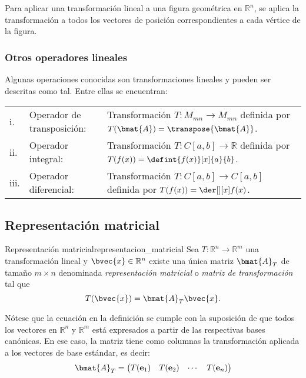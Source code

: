 \documentclass{fmbnotes}
\begin{document}
\begin{tip}
	Para aplicar una transformación lineal a una figura geométrica en \(\mathbb{R}^{n}\), se aplica la transformación a todos los vectores de posición correspondientes a cada vértice de la figura.
\end{tip}

\subsubsection{Otros operadores lineales}
Algunas operaciones conocidas son transformaciones lineales y pueden ser descritas como tal. Entre ellas se encuentran:
\begin{longtable}{lll}
	\rule[1ex]{0pt}{2.5ex}i.&Operador de transposición: &Transformación \(T\colon M_{mn}\to M_{mn}\) definida por \(T(\bmat{A})=\transpose{\bmat{A}}\). \\
	\rule[1ex]{0pt}{2.5ex}ii.&Operador integral: &Transformación \(T\colon C[a,b]\to\mathbb{R}\) definida por \(\displaystyle T(f(x))=\defint{f(x)}[x]{a}{b}\). \\
	\rule[1ex]{0pt}{2.5ex}iii.&Operador diferencial: &Transformación \(T\colon C[a,b]\to C[a,b]\) definida por \(\displaystyle T(f(x))=\der[][x]f(x)\). \\
\end{longtable}

\subsection{Representación matricial}

\begin{definicion}{Representación matricial}{representacion_matricial}
	Sea \(T\colon\mathbb{R}^{n}\to\mathbb{R}^{m}\) una transformación lineal y \(\bvec{x}\in\mathbb{R}^{n}\) existe una única matriz \(\bmat{A}_T\) de tamaño \(m \times n\) denominada \emph{representación matricial} o \emph{matriz de transformación} tal que
	\[T(\bvec{x})=\bmat{A}_T\bvec{x}.\]
\end{definicion}

Nótese que la ecuación en la definición se cumple con la suposición de que todos los vectores en \(\mathbb{R}^{n}\) y \(\mathbb{R}^{m}\) está expresados a partir de las respectivas bases canónicas. En ese caso, la matriz tiene como columnas la transformación aplicada a los vectores de base estándar, es decir:
\[\bmat{A}_T=\begin{pmatrix}
T(\mathbf{e}_1) & T(\mathbf{e}_2) & \cdots & T(\mathbf{e}_n)
\end{pmatrix}\]
\end{document}
